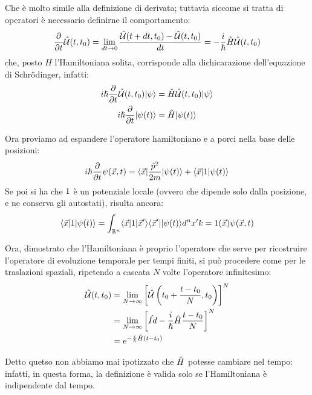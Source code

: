 Che è molto simile alla definizione di derivata; tuttavia siccome si tratta di operatori è necessario definirne il comportamento:
\[
    \deriv[t]{} \U(t, t_0) = \lim_{dt \to 0} \frac{\U(t + dt, t_0) - \U(t, t_0)}{dt} = -\frac{i}{\h} \hat H \U(t, t_0)
\]
che, posto $\hat H$ l'Hamiltoniana solita, corrisponde alla dichicarazione dell'equazione di Schrödinger, infatti:
\begin{gather*}
    i \h \deriv[t]{} \U(t, t_0) |\psi\ket = \hat H \U(t, t_0) |\psi\ket \\
    i \h \deriv[t]{} \Ket {\psi(t)} = \hat H \Ket {\psi(t)}
\end{gather*}

Ora proviamo ad espandere l'operatore hamiltoniano e a porci nella base delle posizioni:
\begin{gather*}
    i \h \tderiv{} {\psi(\vec x,t)} = \Bra{\vec x}\frac{\hat p ^2}{2m} \Ket {\psi(t)} + \Bra{\vec x}\V \Ket {\psi(t)}
\end{gather*}
Se poi si ha che $\V$ è un potenziale locale (ovvero che dipende solo dalla posizione, e ne conserva gli autostati), risulta ancora:
\begin{gather*}
    \Bra{\vec x}\V \Ket {\psi(t)} = \rnint \Bra{\vec x}\V \ketbrabra{\vec x'} \Ket {\psi(t)} d^nx'k = \V(\vec x) \psi(\vec x, t)
\end{gather*}

Ora, dimostrato che l'Hamiltoniana è proprio l'operatore che serve per ricostruire l'operatore di evoluzione temporale per tempi finiti, si può procedere come per le traslazioni spaziali, ripetendo a cascata $N$ volte l'operatore infinitesimo:
\begin{align*}
    \U(t, t_0) &= \lim_{N \to \infty} \left[ \U\left(t_0 + \frac{t - t_0}{N}, t_0\right) \right]^N \\
    &= \lim_{N \to \infty} \left[ \hat{Id} - \frac{i}{\h} \hat H \frac{t - t_0}{N} \right]^N \\
    &= e^{-\frac{i}{\h} \hat H (t - t_0)}
\end{align*}

Detto quetso non abbiamo mai ipotizzato che $\H$ potesse cambiare nel tempo: infatti, in questa forma, la definizione è valida solo se l'Hamiltoniana è indipendente dal tempo.


